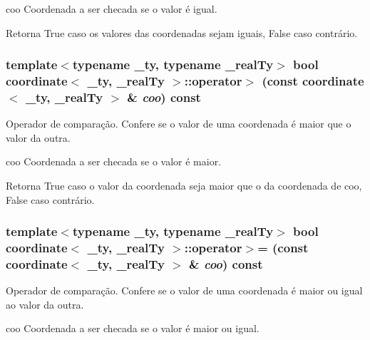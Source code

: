 coo Coordenada a ser checada se o valor é igual.

\begin{DoxyReturn}{Retorna}
True caso os valores das coordenadas sejam iguais, False caso contrário. 
\end{DoxyReturn}
\hypertarget{classcoordinate_a9c19583af7069c444bef4a712ed7fc0c}{
\subsubsection[{operator$>$}]{\setlength{\rightskip}{0pt plus 5cm}template$<$typename \_\-ty, typename \_\-realTy$>$ bool {\bf coordinate}$<$ \_\-ty, \_\-realTy $>$::operator$>$ (const {\bf coordinate}$<$ \_\-ty, \_\-realTy $>$ \& {\em coo}) const}}
\label{classcoordinate_a9c19583af7069c444bef4a712ed7fc0c}
Operador de comparação. Confere se o valor de uma coordenada é maior que o valor da outra.

coo Coordenada a ser checada se o valor é maior.

\begin{DoxyReturn}{Retorna}
True caso o valor da coordenada seja maior que o da coordenada de coo, False caso contrário. 
\end{DoxyReturn}
\hypertarget{classcoordinate_a2b75371880389112fd471f596429fd23}{
\subsubsection[{operator$>$=}]{\setlength{\rightskip}{0pt plus 5cm}template$<$typename \_\-ty, typename \_\-realTy$>$ bool {\bf coordinate}$<$ \_\-ty, \_\-realTy $>$::operator$>$= (const {\bf coordinate}$<$ \_\-ty, \_\-realTy $>$ \& {\em coo}) const}}
\label{classcoordinate_a2b75371880389112fd471f596429fd23}
Operador de comparação. Confere se o valor de uma coordenada é maior ou igual ao valor da outra.

coo Coordenada a ser checada se o valor é maior ou igual.

